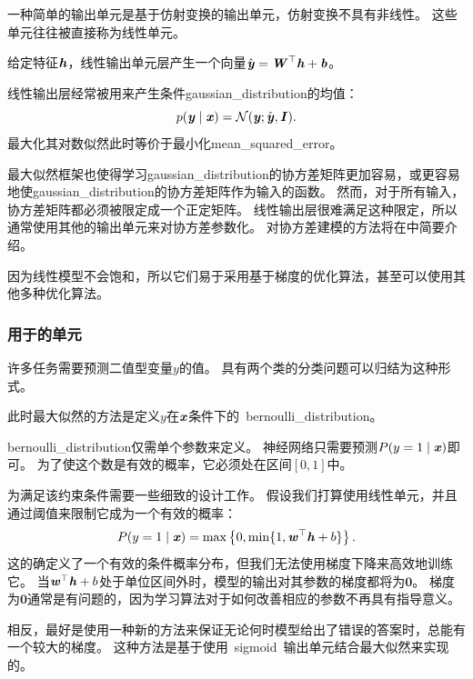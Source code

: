 一种简单的输出单元是基于仿射变换的输出单元，仿射变换不具有非线性。
这些单元往往被直接称为线性单元。

给定特征$\boldsymbol{\mathit{h}}$，线性输出单元层产生一个向量$\hat{\boldsymbol{\mathit{y}}} = \boldsymbol{\mathit{W}}^\top \boldsymbol{\mathit{h}}+\boldsymbol{\mathit{b}}$。

线性输出层经常被用来产生条件\gls{gaussian_distribution}的均值：
\begin{equation}
p(\boldsymbol{\mathit{y}}\mid\boldsymbol{\mathit{x}}) = \mathcal{N}(\boldsymbol{\mathit{y}}; \hat{\boldsymbol{\mathit{y}}}, \boldsymbol{\mathit{I}} ).
\end{equation}
最大化其对数似然此时等价于最小化\gls{mean_squared_error}。

最大似然框架也使得学习\gls{gaussian_distribution}的协方差矩阵更加容易，或更容易地使\gls{gaussian_distribution}的协方差矩阵作为输入的函数。
然而，对于所有输入，协方差矩阵都必须被限定成一个正定矩阵。
线性输出层很难满足这种限定，所以通常使用其他的输出单元来对协方差参数化。
对协方差建模的方法将在中简要介绍。

因为线性模型不会饱和，所以它们易于采用基于梯度的优化算法，甚至可以使用其他多种优化算法。

\subsubsection{用于的单元}
\label{sec:sigmoid_units_for_bernoulli_output_distributions}

许多任务需要预测二值型变量$y$的值。
具有两个类的分类问题可以归结为这种形式。

此时最大似然的方法是定义$y$在$\boldsymbol{\mathit{x}}$条件下的~\gls{bernoulli_distribution}。

\gls{bernoulli_distribution}仅需单个参数来定义。
神经网络只需要预测$P(y =1\mid\boldsymbol{\mathit{x}})$即可。
为了使这个数是有效的概率，它必须处在区间$[0, 1]$中。

为满足该约束条件需要一些细致的设计工作。
假设我们打算使用线性单元，并且通过阈值来限制它成为一个有效的概率：
\begin{equation}
P(y=1 \mid \boldsymbol{\mathit{x}}) = \max \left \{ 0, \min \{1, \boldsymbol{\mathit{w}}^\top \boldsymbol{\mathit{h}}+b \} \right \}.
\end{equation}
这的确定义了一个有效的条件概率分布，但我们无法使用梯度下降来高效地训练它。
当$\boldsymbol{\mathit{w}}^\top \boldsymbol{\mathit{h}}+b$处于单位区间外时，模型的输出对其参数的梯度都将为$\bm{0}$。
梯度为$\bm{0}$通常是有问题的，因为学习算法对于如何改善相应的参数不再具有指导意义。


相反，最好是使用一种新的方法来保证无论何时模型给出了错误的答案时，总能有一个较大的梯度。
这种方法是基于使用~\gls{sigmoid}~输出单元结合最大似然来实现的。

